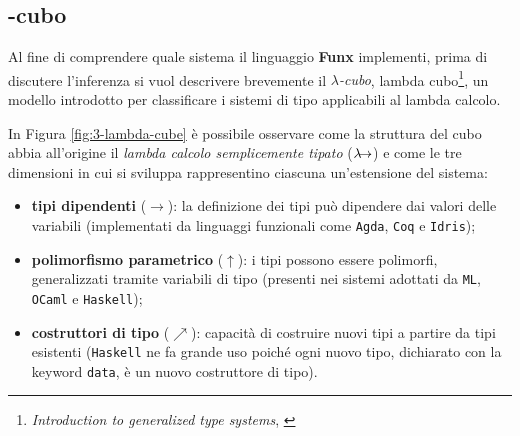 \subsection{\texorpdfstring{\textlambda}{lambda}-cubo}
\label{sec:3-2-lambda-cube}

Al fine di comprendere quale sistema il linguaggio \textbf{Funx} implementi,
prima di discutere l'inferenza si vuol descrivere brevemente il \textit{$\lambda$-cubo},
lambda cubo\footnote{\textit{Introduction to generalized type systems}, \cite{IntroductionGeneralizedTypeSystems}},
un modello introdotto per classificare i sistemi di tipo applicabili al lambda calcolo.


\noindent In Figura \ref{fig:3-lambda-cube} è possibile osservare come la struttura del cubo abbia all'origine
il \textit{lambda calcolo semplicemente tipato} ($\lambda\mkern-9mu\rightarrow$) e come le tre dimensioni
in cui si sviluppa rappresentino ciascuna un'estensione del sistema:
\begin{itemize}
    \item \textbf{tipi dipendenti} ($\rightarrow$): la definizione dei tipi può dipendere dai valori delle variabili
          (implementati da linguaggi funzionali come \texttt{Agda}, \texttt{Coq} e \texttt{Idris});
    \item \textbf{polimorfismo parametrico} ($\uparrow$): i tipi possono essere polimorfi, generalizzati
          tramite variabili di tipo (presenti nei sistemi adottati da \texttt{ML}, \texttt{OCaml} e \texttt{Haskell});
    \item \textbf{costruttori di tipo} ($\nearrow$): capacità di costruire nuovi tipi a partire da tipi esistenti
          (\texttt{Haskell} ne fa grande uso poiché ogni nuovo tipo,
          dichiarato con la keyword \texttt{data}, è un nuovo costruttore di tipo).
\end{itemize}

